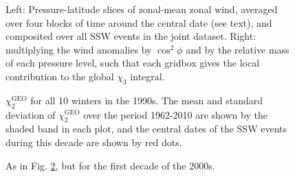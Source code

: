 \documentclass[draft,jgrga]{agutex}
\begin{document}
\begin{figure}
  \noindent
   \caption{ Left: Pressure-latitude slices of zonal-mean zonal wind, averaged over four blocks of time around the central date (see text), and composited over all SSW events in the joint dataset.  Right: multiplying the wind anomalies by $\cos^2 \phi$ and by the relative mass of each pressure level, such that each gridbox gives the local contribution to the global $\chi_3$ integral.
}
   \label{fig:wind_anomaly_composites}
 \end{figure}



\begin{figure}
  \noindent
   \caption{$\chi_2^{\text{GEO}}$ for all 10 winters in the 1990s.  The mean and standard deviation of $\chi_2^{\text{GEO}}$ over the period 1962-2010 are shown by the shaded band in each plot, and the central dates of the  SSW events during this decade are shown by red dots.}
   \label{fig:X2_1990s}
 \end{figure}


\begin{figure}
  \noindent
   \caption{As in Fig. \ref{fig:X2_1990s}, but for the first decade of the 2000s.  }
   \label{fig:X2_2000s}
 \end{figure}



%
%

%
%
%
%
%
%


\end{document}
